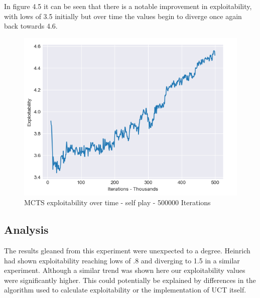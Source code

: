 In figure 4.5 it can be seen that there is a notable improvement in exploitability, with lows of 3.5 initially
but over time the values begin to diverge once again back towards 4.6.

\begin{figure}[ht]
    \includegraphics[scale=.7]{images/exploitability_self-play_deterministic_500000.png}
    \caption{MCTS exploitability over time - self play - 500000 Iterations}
\end{figure}

\subsection{Analysis}\label{subsec:analysis2}
The results gleaned from this experiment were unexpected to a degree.
Heinrich had shown exploitability reaching lows of .8 and diverging to 1.5 in a similar experiment.
Although a similar trend was shown here our exploitability values were significantly higher.
This could potentially be explained by differences in the algorithm used to calculate exploitability
or the implementation of UCT itself.

